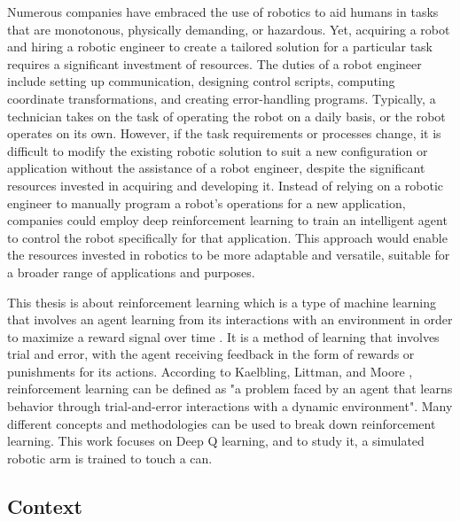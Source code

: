 \documentclass[12pt,oneside]{article}
\begin{document}
Numerous companies have embraced the use of robotics to aid humans in tasks that are monotonous, physically demanding, or hazardous. Yet, acquiring a robot and hiring a robotic engineer to create a tailored solution for a particular task requires a significant investment of resources.
The duties of a robot engineer include setting up communication, designing control scripts, computing coordinate transformations, and creating error-handling programs. Typically, a technician takes on the task of operating the robot on a daily basis, or the robot operates on its own. However, if the task requirements or processes change, it is difficult to modify the existing robotic solution to suit a new configuration or application without the assistance of a robot engineer, despite the significant resources invested in acquiring and developing it.
Instead of relying on a robotic engineer to manually program a robot's operations for a new application, companies could employ deep reinforcement learning to train an intelligent agent to control the robot specifically for that application. This approach would enable the resources invested in robotics to be more adaptable and versatile, suitable for a broader range of applications and purposes.

This thesis is about reinforcement learning which is a type of machine learning that involves an agent learning from its interactions with an environment in order to maximize a reward signal over time \cite{suttonAndBarto}. It is a method of learning that involves trial and error, with the agent receiving feedback in the form of rewards or punishments for its actions. According to Kaelbling, Littman, and Moore \cite{kaelblingLittmanAndMoore}, reinforcement learning can be defined as "a problem faced by an agent that learns behavior through trial-and-error interactions with a dynamic environment".
Many different concepts and methodologies can be used to break down reinforcement learning. This work focuses on Deep Q learning, and to study it, a simulated robotic arm is trained to touch a can.

%
\subsection{Context}
\end{document}
